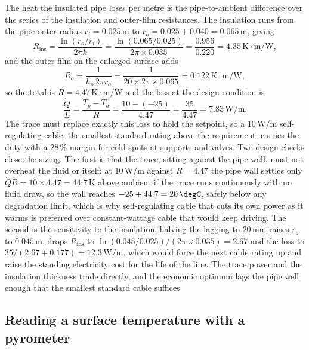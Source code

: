 The heat the insulated pipe loses per metre is the pipe-to-ambient
difference over the series of the insulation and outer-film resistances.
The insulation runs from the pipe outer radius $r_i = 0.025\,\text{m}$ to
$r_o = 0.025 + 0.040 = 0.065\,\text{m}$, giving
\[
R_{\text{ins}} = \frac{\ln(r_o/r_i)}{2\pi k} = \frac{\ln(0.065/0.025)}{
2\pi\times0.035} = \frac{0.956}{0.220} = 4.35\,\si{\kelvin}\cdot\text{m}/
\text{W},
\]
and the outer film on the enlarged surface adds
\[
R_o = \frac{1}{h_o\,2\pi r_o} = \frac{1}{20\times2\pi\times0.065} =
0.122\,\si{\kelvin}\cdot\text{m}/\text{W},
\]
so the total is $R = 4.47\,\si{\kelvin}\cdot\text{m}/\text{W}$ and the loss
at the design condition is
\[
\frac{\dot{Q}}{L} = \frac{T_p - T_a}{R} = \frac{10 - (-25)}{4.47} =
\frac{35}{4.47} = 7.83\,\text{W}/\text{m}.
\]
The trace must replace exactly this loss to hold the setpoint, so a
$10\,\text{W}/\text{m}$ self-regulating cable, the smallest standard rating
above the requirement, carries the duty with a $28\,\%$ margin for cold
spots at supports and valves. Two design checks close the sizing. The
first is that the trace, sitting against the pipe wall, must not overheat
the fluid or itself: at $10\,\text{W}/\text{m}$ against $R = 4.47$ the
pipe wall settles only $\dot{Q}R = 10\times4.47 = 44.7\,\si{\kelvin}$
above ambient if the trace runs continuously with no fluid draw, so the
wall reaches $-25 + 44.7 = 20\,\degC$, safely below any degradation limit,
which is why self-regulating cable that cuts its own power as it warms is
preferred over constant-wattage cable that would keep driving. The second
is the sensitivity to the insulation: halving the lagging to
$20\,\si{\milli\meter}$ raises $r_o$ to $0.045\,\text{m}$, drops
$R_{\text{ins}}$ to $\ln(0.045/0.025)/(2\pi\times0.035) = 2.67$ and the
loss to $35/(2.67 + 0.177) = 12.3\,\text{W}/\text{m}$, which would force
the next cable rating up and raise the standing electricity cost for the
life of the line. The trace power and the insulation thickness trade
directly, and the economic optimum lags the pipe well enough that the
smallest standard cable suffices.

\subsection{Reading a surface temperature with a pyrometer}


